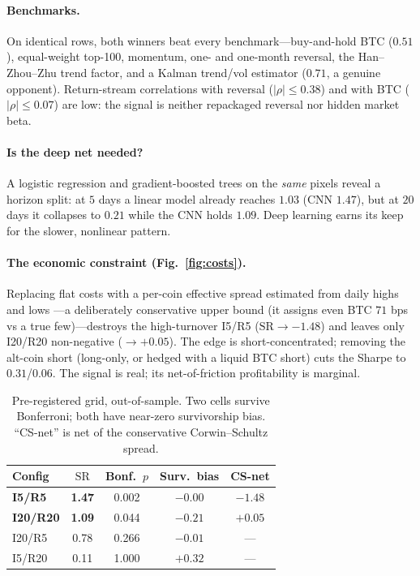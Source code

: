 \documentclass[10pt,twocolumn]{article}
\newcommand{\sharpe}{\ensuremath{\mathrm{SR}}}
\begin{document}
\paragraph{Benchmarks.} On identical rows, both winners beat every benchmark---buy-and-hold BTC
($0.51$), equal-weight top-100, momentum, one- and one-month reversal, the Han--Zhou--Zhu trend factor,
and a Kalman trend/vol estimator ($0.71$, a genuine opponent). Return-stream correlations with reversal
($|\rho|\le0.38$) and with BTC ($|\rho|\le0.07$) are low: the signal is neither repackaged reversal nor
hidden market beta.

\paragraph{Is the deep net needed?} A logistic regression and gradient-boosted trees on the \emph{same}
pixels reveal a horizon split: at $5$ days a linear model already reaches $1.03$ (CNN $1.47$), but at
$20$ days it collapses to $0.21$ while the CNN holds $1.09$. Deep learning earns its keep for the
slower, nonlinear pattern.

\paragraph{The economic constraint (Fig.~\ref{fig:costs}).} Replacing flat costs with a per-coin
effective spread estimated from daily highs and lows \cite{cs}---a deliberately conservative
upper bound (it assigns even BTC $71$ bps vs a true few)---destroys the high-turnover I5/R5 ($\sharpe
\to -1.48$) and leaves only I20/R20 non-negative ($\to +0.05$). The edge is short-concentrated;
removing the alt-coin short (long-only, or hedged with a liquid BTC short) cuts the Sharpe to
$0.31$/$0.06$. The signal is real; its net-of-friction profitability is marginal.

\begin{table}[t]
\centering
\caption{Pre-registered grid, out-of-sample. Two cells survive Bonferroni; both have near-zero
survivorship bias. ``CS-net'' is net of the conservative Corwin--Schultz spread.}
\label{tab:main}
\small
\begin{tabular}{lcccc}
\toprule
Config & \sharpe & Bonf.\ $p$ & Surv.\ bias & CS-net \\
\midrule
\textbf{I5/R5}   & \textbf{1.47} & 0.002 & $-0.00$ & $-1.48$ \\
\textbf{I20/R20} & \textbf{1.09} & 0.044 & $-0.21$ & $+0.05$ \\
I20/R5           & 0.78 & 0.266 & $-0.01$ & --- \\
I5/R20           & 0.11 & 1.000 & $+0.32$ & --- \\
\bottomrule
\end{tabular}
\end{table}
\end{document}
